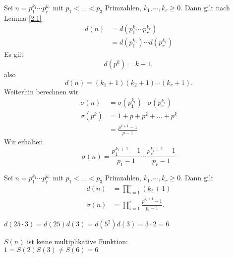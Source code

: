 Sei $n = p_1^{k_1} \dotsm p_r^{k_r}$ mit $p_1 < \dots < p_3$ Primzahlen, $k_1, \dotsm, k_r \geq 0$. Dann gilt nach Lemma \ref{2.1}
\begin{align*}
	d(n) &= d \left( p_1^{k_1} \dotsm p_r^{k_r} \right)\\
	&= d\left(p_1^{k_1}\right) \dotsm d\left(p_r^{k_r}\right)
\end{align*}
Es gilt
\[ d(p^k) = k + 1, \]
also
\[ d(n) = (k_1+1) (k_2+1) \dotsm (k_r+1). \]
Weiterhin berechnen wir
\begin{align*}
	\sigma(n) &= \sigma\left(p_1^{k_1}\right) \dotsm \sigma\left(p_r^{k_r}\right)\\
	\sigma\left(p^k\right) &= 1 +p + p^2 + \dots + p^k\\
	&= \frac{p^{k+1} -1}{p-1}
\end{align*}
Wir erhalten
\[ \sigma(n) = \frac{p_1^{k_1+1} - 1}{p_1-1} \dotsm \frac{p_r^{k_r+1}-1}{p_r-1} \]

\begin{thm}\autolabel
	Sei $n = p_1^{k_1} \dotsm p_r^{k_r}$ mit $p_1 < \dots < p_3$ Primzahlen, $k_1, \dotsm, k_r \geq 0$. Dann gilt 
	\begin{align*}
		d(n) &= \prod_{i=1}^r (k_i+1)\\
		\sigma(n) &= \prod_{i=1}^r \frac{p_i^{k_i + 1}-1}{p_i-1}.
	\end{align*}
\end{thm}

\begin{exmp*}
	\( d(25 \cdot 3) = d(25) d(3) = d(5^2) d(3) = 3 \cdot 2 = 6 \)
\end{exmp*}

\begin{rem*}
	$S(n)$ ist keine multiplikative Funktion:\\
	\( 1 = S(2)S(3) \neq S(6) = 6 \)
\end{rem*}
